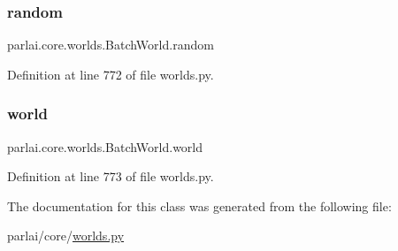 \subsubsection{\texorpdfstring{random}{random}}
{\footnotesize\ttfamily parlai.\+core.\+worlds.\+Batch\+World.\+random}



Definition at line 772 of file worlds.\+py.

\mbox{\label{classparlai_1_1core_1_1worlds_1_1BatchWorld_ad7d651ac0fb1ee9b52ba7f134602e98e}} 
\subsubsection{\texorpdfstring{world}{world}}
{\footnotesize\ttfamily parlai.\+core.\+worlds.\+Batch\+World.\+world}



Definition at line 773 of file worlds.\+py.



The documentation for this class was generated from the following file\+:\begin{DoxyCompactItemize}
\item 
parlai/core/\hyperlink{parlai_2core_2worlds_8py}{worlds.\+py}\end{DoxyCompactItemize}
